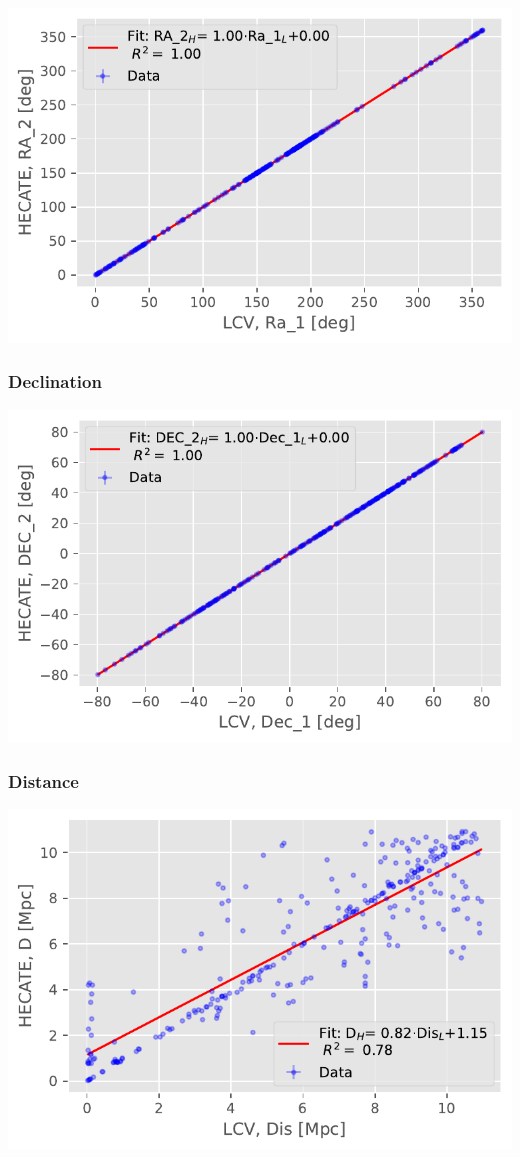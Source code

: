 \documentclass[
]{article}
\begin{document}
\includegraphics{compare_files/figure-pdf/cell-13-output-1.pdf}

\subsubsection{Declination}

\includegraphics{compare_files/figure-pdf/cell-14-output-1.pdf}

\subsubsection{Distance}

\includegraphics{compare_files/figure-pdf/cell-15-output-1.pdf}
\end{document}
